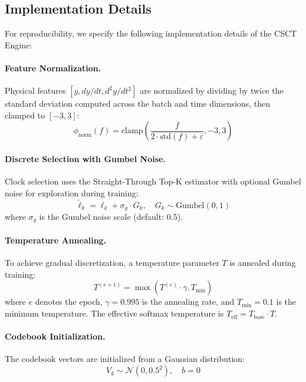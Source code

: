\documentclass{article}
\begin{document}
\subsection{Implementation Details}
\label{sec:impl_details}

For reproducibility, we specify the following implementation details of the CSCT Engine:

\paragraph{Feature Normalization.}
Physical features $[y, dy/dt, d^2y/dt^2]$ are normalized by dividing by twice the standard deviation computed across the batch and time dimensions, then clamped to $[-3, 3]$:
\begin{equation}
    \phi_{\text{norm}}(f) = \text{clamp}\left(\frac{f}{2 \cdot \text{std}(f) + \varepsilon}, -3, 3\right)
\end{equation}

\paragraph{Discrete Selection with Gumbel Noise.}
Clock selection uses the Straight-Through Top-K estimator with optional Gumbel noise for exploration during training:
\begin{equation}
    \tilde{\ell}_k = \ell_k + \sigma_g \cdot G_k, \quad G_k \sim \text{Gumbel}(0,1)
\end{equation}
where $\sigma_g$ is the Gumbel noise scale (default: 0.5).

\paragraph{Temperature Annealing.}
To achieve gradual discretization, a temperature parameter $T$ is annealed during training:
\begin{equation}
    T^{(e+1)} = \max(T^{(e)} \cdot \gamma, T_{\min})
\end{equation}
where $e$ denotes the epoch, $\gamma = 0.995$ is the annealing rate, and $T_{\min} = 0.1$ is the minimum temperature. The effective softmax temperature is $T_{\text{eff}} = T_{\text{base}} \cdot T$.

\paragraph{Codebook Initialization.}
The codebook vectors are initialized from a Gaussian distribution:
\begin{equation}
    V_k \sim \mathcal{N}(0, 0.5^2), \quad b = 0
\end{equation}
\end{document}
